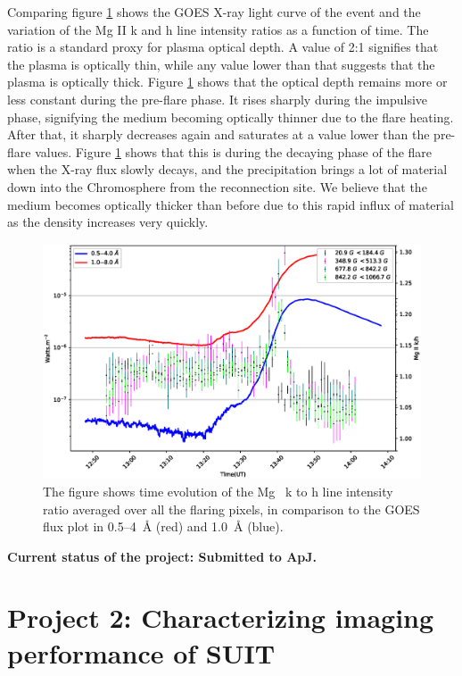 \documentclass[a4paper,11pt]{article}
\begin{document}
Comparing figure \ref{fig:optical_dep_ev_m} shows the GOES X-ray light curve of the event and the variation of the Mg II k and h line intensity ratios as a function of time. The ratio is a standard proxy for plasma optical depth. A value of 2:1 signifies that the plasma is optically thin, while any value lower than that suggests that the plasma is optically thick. Figure \ref{fig:optical_dep_ev_m} shows that the optical depth remains more or less constant during the pre-flare phase. It rises sharply during the impulsive phase, signifying the medium becoming optically thinner due to the flare heating. After that, it sharply decreases again and saturates at a value lower than the pre-flare values. Figure \ref{fig:optical_dep_ev_m} shows that this is during the decaying phase of the flare when the X-ray flux slowly decays, and the precipitation brings a lot of material down into the Chromosphere from the reconnection site. We believe that the medium becomes optically thicker than before due to this rapid influx of material as the density increases very quickly.

\begin{figure}[ht!]
    \centering
    \includegraphics[width=0.8\linewidth]{Figures/Nov-11-2015-optical-dep-ev-3.eps}
    \caption{The figure shows time evolution of the Mg~ k to h line intensity ratio averaged over all the flaring pixels, in comparison to the GOES flux plot in 0.5{--}4~{\AA} (red) and 1.0~{\AA} (blue).}
    \label{fig:optical_dep_ev_m}
\end{figure}

\textbf{Current status of the project: Submitted to ApJ.}

\section*{Project 2: Characterizing imaging performance of SUIT}\label{sec2}
\end{document}
